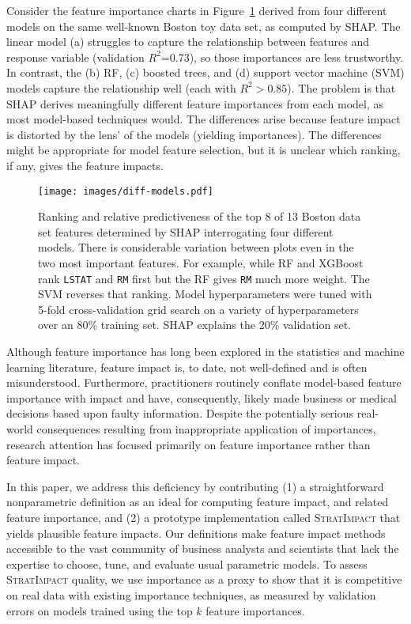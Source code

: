 \documentclass[smallextended]{svjour3}       %
\newcommand{\figref}[1]{Figure~\ref{#1}}
\newcommand{\simp}{\fontfamily{cmr}\textsc{\small StratImpact}}
\begin{document}
Consider the feature importance charts in \figref{fig:diff-models} derived from four different models on the same well-known Boston toy data set, as computed by SHAP. The linear model (a) struggles to capture the relationship between features and response variable (validation $R^2$=0.73), so those importances are less trustworthy.  In contrast, the (b) RF, (c) boosted trees, and (d) support vector machine (SVM) models capture the relationship well (each with $R^2 > 0.85$). The problem is that SHAP derives meaningfully different feature importances from each model, as most model-based techniques would. The differences arise because feature impact is distorted by the lens' of the models (yielding importances). The differences might be appropriate for model feature selection, but it is unclear which ranking, if any, gives the feature impacts. 

\begin{figure}[htbp]
\begin{center}
\texttt{[image: images/diff-models.pdf]}
\vspace{-3mm}
\caption{\small Ranking and relative predictiveness of the top 8 of 13 Boston data set features determined by SHAP interrogating four different models.  There is considerable variation between plots even in the two most important features. For example, while RF and XGBoost rank {\tt LSTAT} and {\tt RM} first but the RF gives {\tt RM} much more weight. The SVM reverses that ranking. Model hyperparameters were tuned with 5-fold cross-validation grid search on a variety of hyperparameters over an 80\% training set.  SHAP explains the 20\% validation set.}
\label{fig:diff-models}
\end{center}
\end{figure}

Although feature importance has long been explored in the statistics and machine learning literature, feature impact is, to date, not well-defined and is often misunderstood. Furthermore, practitioners routinely conflate model-based feature importance with impact and have, consequently, likely made business or medical decisions based upon faulty information. Despite the potentially serious real-world consequences resulting from inappropriate application of importances, research attention has focused primarily on feature importance rather than feature impact. 

In this paper, we address this deficiency by contributing (1) a straightforward nonparametric definition as an ideal for computing feature impact, and related feature importance, and (2) a prototype implementation called \simp{} that yields plausible feature impacts. Our definitions make feature impact methods accessible to the vast community of business analysts and scientists that lack the expertise to choose, tune, and evaluate usual parametric models. To assess \simp{} quality, we use importance as a proxy to show that it is competitive on real data with existing importance techniques, as measured by validation errors on models trained using the top $k$ feature importances.  
\end{document}
